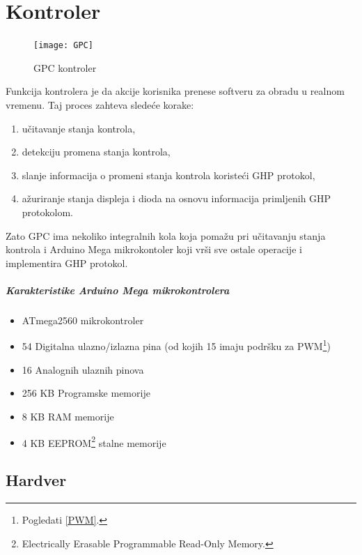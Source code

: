 \documentclass[12pt,oneside]{memoir}
\begin{document}
	\chapter{Kontroler}
	
	\begin{figure}[h]
		\texttt{[image: GPC]}
		\caption{GPC kontroler}
		\label{Slika:GPC}
	\end{figure}
	
	Funkcija kontrolera je da akcije korisnika prenese softveru za obradu u realnom vremenu.
	Taj proces zahteva sledeće korake:
	\begin{enumerate}
		\item učitavanje stanja kontrola,
		\item detekciju promena stanja kontrola,
		\item slanje informacija o promeni stanja kontrola koristeći GHP protokol,
		\item ažuriranje stanja displeja i dioda na osnovu informacija primljenih GHP protokolom.
	\end{enumerate}
	Zato GPC ima nekoliko integralnih kola koja pomažu pri učitavanju stanja kontrola i Arduino Mega mikrokontoler koji vrši sve ostale operacije i implementira GHP protokol.
	\paragraph{Karakteristike Arduino Mega mikrokontrolera}
	\begin{itemize}
		\item ATmega2560 mikrokontroler
		\item 54 Digitalna ulazno/izlazna pina (od kojih 15 imaju podršku za PWM\footnote{Pogledati \ref{PWM}.})
		\item 16 Analognih ulaznih pinova
		\item 256 KB Programske memorije
		\item 8 KB RAM memorije
		\item 4 KB EEPROM\footnote{Electrically Erasable Programmable Read-Only Memory.} stalne memorije
	\end{itemize}
	\section{Hardver}
\end{document}
